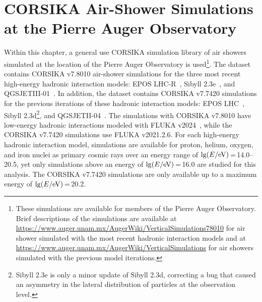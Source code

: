 
\section{CORSIKA Air-Shower Simulations at the Pierre Auger Observatory}\label{sec:simulationdataset}
Within this chapter, a general use CORSIKA simulation library of air showers simulated at the location of the Pierre Auger Observatory is used\footnote[1]{These simulations are available for members of the Pierre Auger Observatory. Brief descriptions of the simulations are available at \\ \href{https://www.auger.unam.mx/AugerWiki/VerticalSimulations78010}{https://www.auger.unam.mx/AugerWiki/VerticalSimulations78010} for air shower simulated with the most recent hadronic interaction models and at \\ \href{https://www.auger.unam.mx/AugerWiki/VerticalSimulations}{https://www.auger.unam.mx/AugerWiki/VerticalSimulations} for air showers simulated with the previous model iterations.}.
The dataset contains CORSIKA v7.8010 air-shower simulations for the three most recent high-energy hadronic interaction models: EPOS LHC-R~\cite{icrc2025_pierog}, Sibyll 2.3e~\cite{riehn_prd2019_sibyll23d}, and QGSJETIII-01~\cite{ostapchenko_prd2024_qgsjet3_formalism,ostapchenko_prd2024_qgsjet3_production}.
In addition, the dataset contains CORSIKA v7.7420 simulations for the previous iterations of these hadronic interaction models: EPOS LHC~\cite{pierog_prc2013_eposlhc}, Sibyll 2.3d\footnote[2]{Sibyll 2.3e is only a minor update of Sibyll 2.3d, correcting a bug that caused an asymmetry in the lateral distribution of particles at the observation level.}, and QGSJETII-04~\cite{ostapchenko_prd2010_qgsjetii}.
The simulations with CORSIKA v7.8010 have low-energy hadronic interactions modeled with FLUKA v2024~\cite{fluka_2005_original,fluka_2024_overview}, while the CORSIKA v7.7420 simulations use FLUKA v2021.2.6.
For each high-energy hadronic interaction model, simulations are available for proton, helium, oxygen, and iron nuclei as primary cosmic rays over an energy range of $\lg(E / \rm eV)$\,=\,\numrange{14.0}{20.5}, yet only simulations above an energy of $\lg(E / \rm eV)$\,=\,16.0 are studied for this analysis.
The CORSIKA v7.7420 simulations are only available up to a maximum energy of $\lg(E / \rm eV)$\,=\,20.2.
